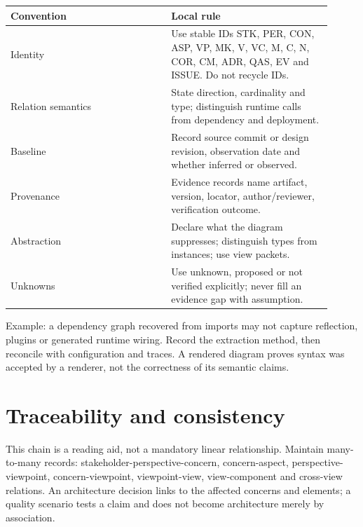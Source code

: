 \documentclass[11pt,letterpaper]{article}
\newcommand{\docsection}[1]{\Needspace{5\baselineskip}\section{#1}}
\begin{document}
\begin{longtable}{@{}>{\RaggedRight\arraybackslash}p{0.457\linewidth}>{\RaggedRight\arraybackslash}p{0.457\linewidth}@{}}
\toprule
\textbf{Convention} & \textbf{Local rule}\\\midrule
\endhead
Identity & Use stable IDs STK, PER, CON, ASP, VP, MK, V, VC, M, C, N, COR, CM, ADR, QAS, EV and ISSUE. Do not recycle IDs.\\
Relation semantics & State direction, cardinality and type; distinguish runtime calls from dependency and deployment.\\
Baseline & Record source commit or design revision, observation date and whether inferred or observed.\\
Provenance & Evidence records name artifact, version, locator, author/reviewer, verification outcome.\\
Abstraction & Declare what the diagram suppresses; distinguish types from instances; use view packets.\\
Unknowns & Use unknown, proposed or not verified explicitly; never fill an evidence gap with assumption.\\
\bottomrule
\end{longtable}
Example: a dependency graph recovered from imports may not capture reflection, plugins or generated runtime wiring. Record the extraction method, then reconcile with configuration and traces. A rendered diagram proves syntax was accepted by a renderer, not the correctness of its semantic claims.

\docsection{Traceability and consistency}
\begin{center}\end{center}
This chain is a reading aid, not a mandatory linear relationship. Maintain many-to-many records: stakeholder-perspective-concern, concern-aspect, perspective-viewpoint, concern-viewpoint, viewpoint-view, view-component and cross-view relations. An architecture decision links to the affected concerns and elements; a quality scenario tests a claim and does not become architecture merely by association.
\end{document}
